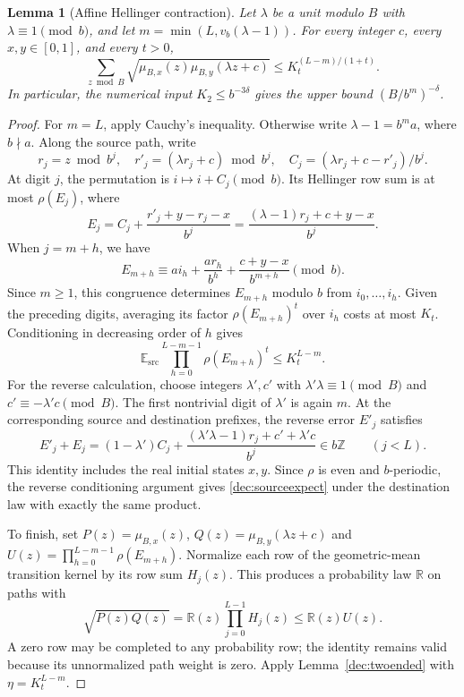 \documentclass[11pt,a4paper]{article}
\theoremstyle{paperplain}
\newtheorem{lemma}[theorem]{Lemma}
\numberwithin{equation}{section}
\begin{document}
\begin{lemma}[Affine Hellinger contraction]\label{dec:hellinger}
Let $\lambda$ be a unit modulo $B$ with $\lambda\equiv1\pmod b$, and let
$m=\min(L,v_b(\lambda-1))$. For every integer $c$, every $x,y\in[0,1]$,
and every $t>0$,
\begin{equation}\label{dec:hellingerbound}
 \sum_{z\bmod B}\sqrt{\mu_{B,x}(z)\mu_{B,y}(\lambda z+c)}
 \le K_t^{(L-m)/(1+t)}.
\end{equation}
In particular, the numerical input $K_2\le b^{-3\delta}$ gives the
upper bound $(B/b^m)^{-\delta}$.
\end{lemma}
\begin{proof}
For $m=L$, apply Cauchy's inequality. Otherwise write
$\lambda-1=b^ma$, where $b\nmid a$. Along the source path, write
\[
 r_j=z\bmod b^j,\quad r'_j=(\lambda r_j+c)\bmod b^j,
 \quad C_j=(\lambda r_j+c-r'_j)/b^j.
\]
At digit $j$, the permutation is $i\mapsto i+C_j\pmod b$.
Its Hellinger row sum is at most $\rho(E_j)$, where
\[
 E_j=C_j+\frac{r'_j+y-r_j-x}{b^j}
 =\frac{(\lambda-1)r_j+c+y-x}{b^j}.
\]
When $j=m+h$, we have
\[
 E_{m+h}\equiv ai_h+\frac{ar_h}{b^h}
                  +\frac{c+y-x}{b^{m+h}}\pmod b.
\]
Since $m\ge1$, this congruence determines $E_{m+h}$ modulo $b$
from $i_0,\ldots,i_h$. Given the preceding digits, averaging its
factor $\rho(E_{m+h})^t$ over $i_h$ costs at most $K_t$.
Conditioning in decreasing order of $h$ gives
\begin{equation}\label{dec:sourceexpect}
 \mathbb E_{\mathrm{src}}\prod_{h=0}^{L-m-1}\rho(E_{m+h})^t
 \le K_t^{L-m}.
\end{equation}
For the reverse calculation, choose integers $\lambda',c'$ with
$\lambda'\lambda\equiv1\pmod B$ and $c'\equiv-\lambda'c\pmod B$.
The first nontrivial digit of $\lambda'$ is again $m$.
At the corresponding source and destination prefixes, the reverse error
$E'_j$ satisfies
\[
 E'_j+E_j
 =(1-\lambda')C_j+
 \frac{(\lambda'\lambda-1)r_j+c'+\lambda'c}{b^j}
 \in b\mathbb Z\qquad(j<L).
\]
This identity includes the real initial states $x,y$.
Since $\rho$ is even and $b$-periodic, the reverse conditioning
argument gives \eqref{dec:sourceexpect} under the destination law
with exactly the same product.

To finish, set $P(z)=\mu_{B,x}(z)$,
$Q(z)=\mu_{B,y}(\lambda z+c)$ and
$U(z)=\prod_{h=0}^{L-m-1}\rho(E_{m+h})$.
Normalize each row of the geometric-mean transition kernel by its
row sum $H_j(z)$. This produces a probability law $\mathbb R$ on
paths with
\[
 \sqrt{P(z)Q(z)}=\mathbb R(z)\prod_{j=0}^{L-1}H_j(z)
 \le\mathbb R(z)U(z).
\]
A zero row may be completed to any probability row; the identity
remains valid because its unnormalized path weight is zero.
Apply Lemma~\ref{dec:twoended} with $\eta=K_t^{L-m}$.
\end{proof}
\end{document}

